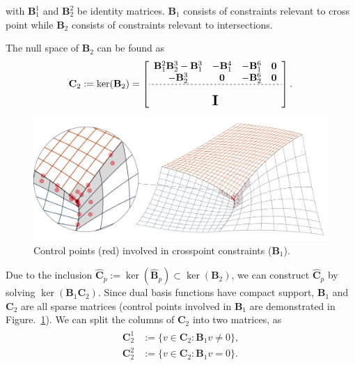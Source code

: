 \documentclass[preprint,12pt]{elsarticle}
\begin{document}
with $\mathbf{B}_1^1$ and $\mathbf{B}_2^2$ be identity matrices. $\mathbf{B}_1$ consists of constraints relevant to cross point while $\mathbf{B}_2$ consists of constraints relevant to intersections. \par
The null space of ${\mathbf{B}}_2$ can be found as
\begin{equation}
    \mathbf{C}_2:=\ker({\mathbf{B}}_2)=
    \left[\begin{array}{cccc}
      \mathbf{B}_1^2\mathbf{B}_2^3-\mathbf{B}_1^3 & -\mathbf{B}_1^4 & -\mathbf{B}_1^6 & \mathbf{0} \\ 
      -\mathbf{B}_2^3 & \mathbf{0} & -\mathbf{B}_2^6 & \mathbf{0} \\ \hdashline[2pt/2pt]
       \multicolumn{4}{c}{\multirow{3}{*}{\raisebox{0mm}{\scalebox{1.5}{$\mathbf{I}$}}}}\\
       & & & 
    \end{array}\right].
\end{equation}
\begin{figure}[hbt]
	\centering
    \includegraphics[width=\linewidth]{mesh_spy}
	\caption{Control points (red) involved in crosspoint constraints ($\mathbf{B}_1$).}\label{fig:cross_point_dof}
\end{figure}
Due to the inclusion $\hat{\mathbf{C}}_p:=\ker(\hat{\mathbf{B}}_p)\subset{\ker({\mathbf{B}}_2)}$, we can construct $\hat{\mathbf{C}}_p$ by solving $\ker(\mathbf{B}_1\mathbf{C}_2)$. Since dual basis functions have compact support, $\mathbf{B}_1$ and $\mathbf{C}_2$ are all sparse matrices (control points involved in $\mathbf{B}_1$ are demonstrated in Figure.~\ref{fig:cross_point_dof}). We can split the columns of $\mathbf{C}_2$ into two matrices, as
\begin{align}
    \begin{split}
        \mathbf{C}_2^1&:=\{v\in\mathbf{C}_2\colon{\mathbf{B}_1v\neq{0}}\},\\
        \mathbf{C}_2^2&:=\{v\in\mathbf{C}_2\colon{\mathbf{B}_1v={0}}\}.
    \end{split}
\end{align}
\end{document}
